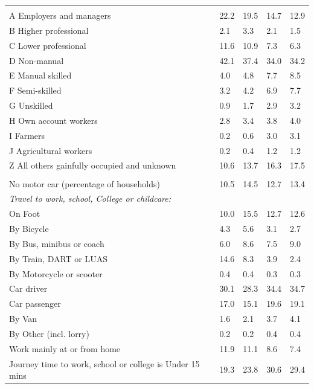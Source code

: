 \documentclass{article}
\begin{document}
\begin{table}[h]
\begin{tabular}{KTTTT}
\hline
    \\ 
    \hline
A Employers and managers & 22.2& 19.5& 14.7& 12.9\\
B Higher professional & 2.1& 3.3& 2.1& 1.5\\
C Lower professional & 11.6& 10.9&  7.3&  6.3\\
D Non-manual & 42.1& 37.4& 34.0& 34.2\\
E Manual skilled & 4.0& 4.8& 7.7& 8.5\\
F Semi-skilled & 3.2& 4.2& 6.9& 7.7\\
G Unskilled & 0.9& 1.7& 2.9& 3.2\\
H Own account workers & 2.8& 3.4& 3.8& 4.0\\
I Farmers & 0.2& 0.6& 3.0& 3.1\\
J Agricultural workers & 0.2& 0.4& 1.2& 1.2\\
Z All others gainfully occupied and unknown & 10.6& 13.7& 16.3& 17.5\\
\hline
{}\hline
    \\ 
    \hline
No motor car (percentage of households) & 10.5& 14.5& 12.7& 
13.4\\
    \hline 
\emph{Travel to work, school, College or childcare:} & & & \\
\quad On Foot & 10.0& 15.5& 12.7& 12.6\\ 
\quad By Bicycle & 4.3& 5.6& 3.1& 2.7\\ 
\quad By Bus, minibus or coach & 6.0& 8.6& 7.5& 9.0\\
\quad By Train, DART or LUAS & 14.6&  8.3&  3.9&  2.4\\
\quad By Motorcycle or scooter & 0.4& 0.4& 0.3& 0.3\\
\quad Car driver & 30.1 & 28.3& 34.4& 34.7\\
\quad Car passenger & 17.0& 15.1& 19.6& 19.1\\
\quad By Van & 1.6& 2.1& 3.7& 4.1\\
\quad By Other (incl. lorry) & 0.2& 0.2& 0.4& 0.4\\
    \hline
Work mainly at or from home & 11.9& 11.1&  8.6&  7.4\\
Journey time to work, school or college is Under 15 mins & 19.3& 23.8& 30.6& 29.4\\

\end{tabular}
\end{table}
\end{document}
